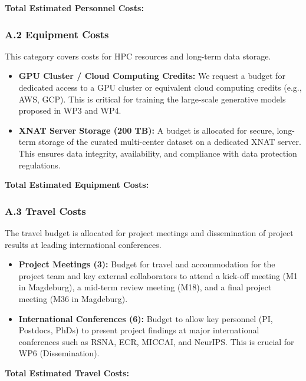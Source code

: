\textbf{Total Estimated Personnel Costs: }

\subsubsection*{A.2 Equipment Costs}
This category covers costs for HPC resources and long-term data storage.
\begin{itemize}
    \item \textbf{GPU Cluster / Cloud Computing Credits:} We request a budget for dedicated access to a GPU cluster or equivalent cloud computing credits (e.g., AWS, GCP). This is critical for training the large-scale generative models proposed in WP3 and WP4.
    \item \textbf{XNAT Server Storage (200 TB):} A budget is allocated for secure, long-term storage of the curated multi-center dataset on a dedicated XNAT server. This ensures data integrity, availability, and compliance with data protection regulations.
\end{itemize}

\textbf{Total Estimated Equipment Costs: }

\subsubsection*{A.3 Travel Costs}
The travel budget is allocated for project meetings and dissemination of project results at leading international conferences.
\begin{itemize}
    \item \textbf{Project Meetings (3):} Budget for travel and accommodation for the project team and key external collaborators to attend a kick-off meeting (M1 in Magdeburg), a mid-term review meeting (M18), and a final project meeting (M36 in Magdeburg).
    \item \textbf{International Conferences (6):} Budget to allow key personnel (PI, Postdocs, PhDs) to present project findings at major international conferences such as RSNA, ECR, MICCAI, and NeurIPS. This is crucial for WP6 (Dissemination).
\end{itemize}

\textbf{Total Estimated Travel Costs: }

